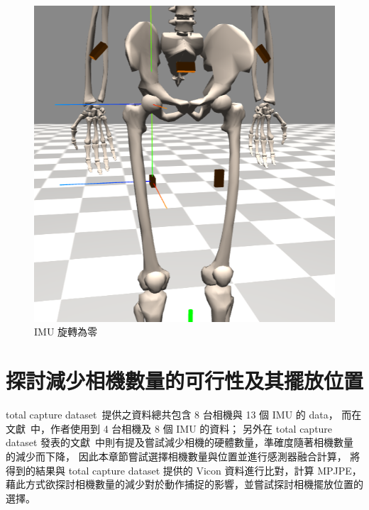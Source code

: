 \begin{figure}[!ht]
\begin{minipage}{.3\textwidth}
   \end{minipage}%
   \begin{minipage}{.3\textwidth}
      \centering
      \includegraphics[width=.8\linewidth, height=.8\linewidth]{figure/ch3_fig_imu_rot.png}
      \caption[IMU 旋轉為零]{IMU 旋轉為零}
      \label{ch3_fig_imu_rot}
    \end{minipage}
\end{figure}

\section{探討減少相機數量的可行性及其擺放位置}
total capture dataset~\cite{Trumble:BMVC:2017}提供之資料總共包含 8 台相機與 13 個 IMU 的 data，
而在文獻~\cite{zhang2020fusing}中，作者使用到 4 台相機及 8 個 IMU 的資料；
另外在 total capture dataset 發表的文獻~\cite{trumble2017total}中則有提及嘗試減少相機的硬體數量，準確度隨著相機數量的減少而下降，
因此本章節嘗試選擇相機數量與位置並進行感測器融合計算，
將得到的結果與 total capture dataset 提供的 Vicon 資料進行比對，計算 MPJPE，
藉此方式欲探討相機數量的減少對於動作捕捉的影響，並嘗試探討相機擺放位置的選擇。

